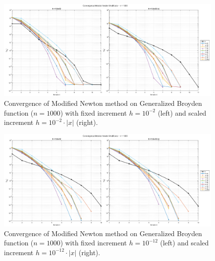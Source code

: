 \documentclass[a4paper,12pt]{article}
\begin{document}
	\newpage
	\begin{figure}[htbp]
		\centering
		\includegraphics[width=\textwidth]{../immagini/broyden_1k_h2.png}
		\caption{Convergence of Modified Newton method on Generalized Broyden function ($n=1000$) with fixed increment $h = 10^{-2}$ (left) and scaled increment $h = 10^{-2}\cdot|x|$ (right).}
		\label{fig:fd_broyden_1k_h2}
	\end{figure}
	
	\begin{figure}[htbp]
		\centering
		\includegraphics[width=\textwidth]{../immagini/broyden_1k_h12.png}
		\caption{Convergence of Modified Newton method on Generalized Broyden function ($n=1000$) with fixed increment $h = 10^{-12}$ (left) and scaled increment $h = 10^{-12}\cdot|x|$ (right).}
		\label{fig:fd_broyden_1k_h12}
	\end{figure}
	\newpage
	
\end{document}
